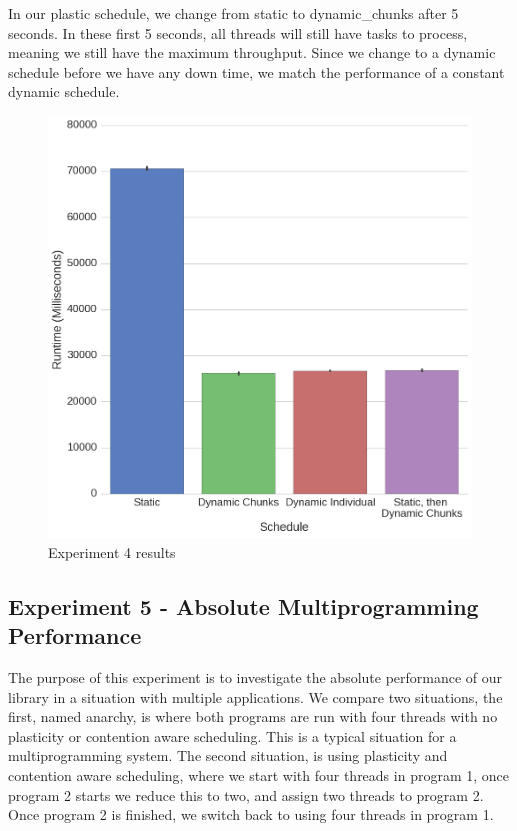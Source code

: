 In our plastic schedule, we change from static to dynamic\_chunks after 5 seconds. In these first 5 seconds, all threads will still have tasks to process, meaning we still have the maximum throughput. Since we change to a dynamic schedule before we have any down time, we match the performance of a constant dynamic schedule.



\begin{figure}
	\centering
	\includegraphics[width=\textwidth]{graphics/experiment4.png}
	\caption{Experiment 4 results}
	\label{fig:results_ex4}
\end{figure}





\subsection{Experiment 5 - Absolute Multiprogramming Performance}

The purpose of this experiment is to investigate the absolute performance of our library in a situation with multiple applications. We compare two situations, the first, named anarchy, is where both programs are run with four threads with no plasticity or contention aware scheduling. This is a typical situation for a multiprogramming system. The second situation, is using plasticity and contention aware scheduling, where we start with four threads in program 1, once program 2 starts we reduce this to two, and assign two threads to program 2. Once program 2 is finished, we switch back to using four threads in program 1.

